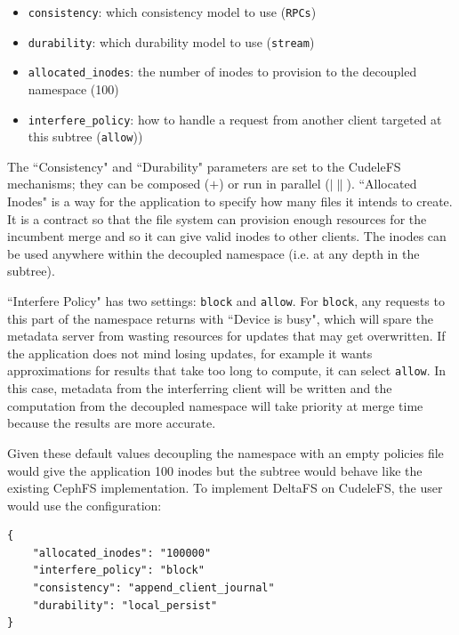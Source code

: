 \begin{itemize}

  \item \texttt{consistency}: which consistency model to use (\texttt{RPCs})

  \item \texttt{durability}: which durability model to use (\texttt{stream})

  \item \texttt{allocated\_inodes}: the number of inodes to provision to the
  decoupled namespace (100)

  \item \texttt{interfere\_policy}: how to handle a request from another
  client targeted at this subtree (\texttt{allow}))

\end{itemize}

The ``Consistency" and ``Durability" parameters are set to the CudeleFS
mechanisms; they can be composed (\(+\)) or run in parallel (\(|\|\)).
``Allocated Inodes" is a way for the application to specify how many files it
intends to create. It is a contract so that the file system can provision
enough resources for the incumbent merge and so it can give valid inodes to
other clients. The inodes can be used anywhere within the decoupled namespace
({i.e.} at any depth in the subtree).

``Interfere Policy" has two settings: \texttt{block} and \texttt{allow}.
For \texttt{block}, any requests to this part of the namespace returns with
``Device is busy", which will spare the metadata server from wasting resources
for updates that may get overwritten. If the application does not mind losing
updates, for example it wants approximations for results that take too long to
compute, it can select \texttt{allow}. In this case, metadata from the interferring client will be
written and the computation from the decoupled namespace will take priority at
merge time because the results are more accurate.

Given these default values decoupling the namespace with an empty policies file
would give the application 100 inodes but the subtree would behave like the
existing CephFS implementation. To implement DeltaFS on CudeleFS, the user
would use the configuration:

\begin{listing}[h]
\begin{verbatim}
{     
    "allocated_inodes": "100000"
    "interfere_policy": "block"
    "consistency": "append_client_journal"
    "durability": "local_persist"
}
\end{verbatim}
\end{listing}

